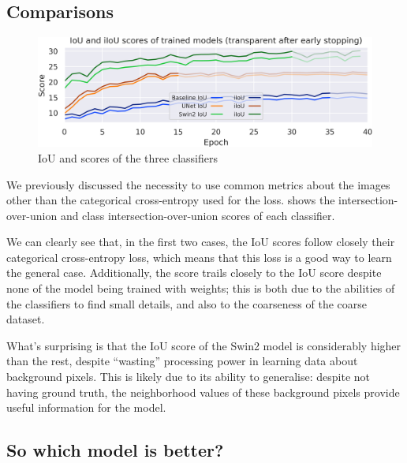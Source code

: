\newpage{}

\subsection{Comparisons}
\label{comparison_section}

\begin{figure}[h]
	\centering
	\includegraphics[width=.8\textwidth]{iou_scores.png}
	\caption{IoU and \iiouc{} scores of the three classifiers}
	\label{comparisons}
\end{figure}

We previously discussed the necessity to use common metrics about the images other than the categorical cross-entropy used for the loss.
 shows the intersection-over-union and class intersection-over-union scores of each classifier.


We can clearly see that, in the first two cases, the IoU scores follow closely their categorical cross-entropy loss, which means that this loss is a good way to learn the general case.
Additionally, the \iiouc{} score trails closely to the IoU score despite none of the model being trained with weights; this is both due to the abilities of the classifiers to find small details, and also to the coarseness of the coarse dataset.

What's surprising is that the IoU score of the Swin2 model is considerably higher than the rest, despite ``wasting'' processing power in learning data about background pixels.
This is likely due to its ability to generalise: despite not having ground truth, the neighborhood values of these background pixels provide useful information for the model.

\subsection{So which model is better?}

